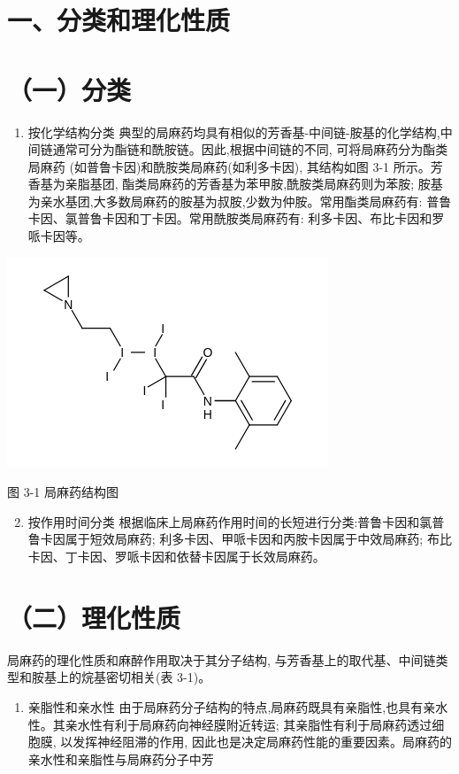 \documentclass[10pt]{article}
\begin{document}
\section*{一、分类和理化性质}
\section*{（一）分类}
\begin{enumerate}
  \item 按化学结构分类 典型的局麻药均具有相似的芳香基-中间链-胺基的化学结构,中间链通常可分为酯链和酰胺链。因此,根据中间链的不同, 可将局麻药分为酯类局麻药 (如普鲁卡因)和酰胺类局麻药(如利多卡因), 其结构如图 3-1 所示。芳香基为亲脂基团, 酯类局麻药的芳香基为苯甲胺,酰胺类局麻药则为苯胺; 胺基为亲水基团,大多数局麻药的胺基为叔胺,少数为仲胺。常用酯类局麻药有: 普鲁卡因、氯普鲁卡因和丁卡因。常用酰胺类局麻药有: 利多卡因、布比卡因和罗哌卡因等。
\end{enumerate}

\includegraphics{smile-lyefuty13x63nmxrq25.png}


图 3-1 局麻药结构图

\begin{enumerate}
  \setcounter{enumi}{1}
  \item 按作用时间分类 根据临床上局麻药作用时间的长短进行分类:普鲁卡因和氯普鲁卡因属于短效局麻药; 利多卡因、甲哌卡因和丙胺卡因属于中效局麻药; 布比卡因、丁卡因、罗哌卡因和依替卡因属于长效局麻药。
\end{enumerate}

\section*{（二）理化性质}
局麻药的理化性质和麻醉作用取决于其分子结构, 与芳香基上的取代基、中间链类型和胺基上的烷基密切相关(表 3-1)。

\begin{enumerate}
  \item 亲脂性和亲水性 由于局麻药分子结构的特点,局麻药既具有亲脂性,也具有亲水性。其亲水性有利于局麻药向神经膜附近转运; 其亲脂性有利于局麻药透过细胞膜, 以发挥神经阻滞的作用, 因此也是决定局麻药性能的重要因素。局麻药的亲水性和亲脂性与局麻药分子中芳
\end{enumerate}
\end{document}
